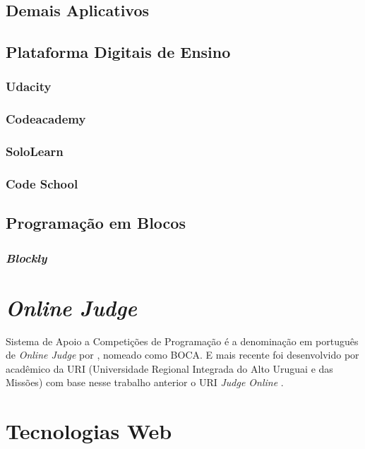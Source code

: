 {\subsection{Demais Aplicativos}

\subsection{Plataforma Digitais de Ensino}


\subsubsection{Udacity}

\subsubsection{Codeacademy}

\subsubsection{SoloLearn}

\subsubsection{Code School}

\subsection{Programação em Blocos}

\subsubsection{\textit{Blockly}}

\section{\textit{Online Judge}}

Sistema de Apoio a Competições de Programação é a denominação em português de
\textit{Online Judge} por , nomeado como BOCA.
E mais recente foi desenvolvido por acadêmico da URI (Universidade Regional
Integrada do Alto Uruguai e das Missões) com base nesse trabalho anterior o URI
\textit{Judge Online} \cite{tonin2012etal}.

\section{Tecnologias Web}

}
